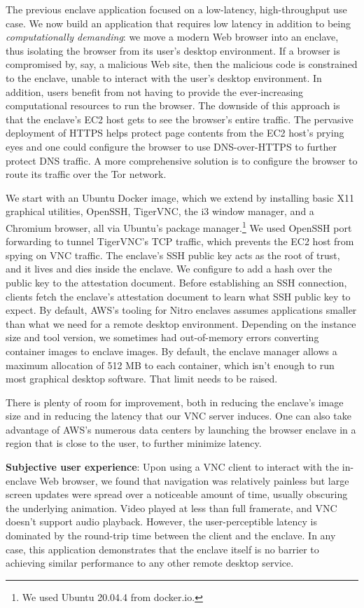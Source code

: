 The previous enclave application focused on a low-latency, high-throughput use
case.  We now build an application that requires low latency in addition to
being \emph{computationally demanding}: we move a modern Web browser into an
enclave, thus isolating the browser from its user's desktop environment.
If a browser is compromised by, say, a malicious Web site, then the malicious
code is constrained to the enclave, unable to interact with the user's desktop
environment.  In addition, users benefit from not having to provide the
ever-increasing computational resources to run the browser.
The downside of this approach is that the enclave's EC2 host gets to see the
browser's entire traffic.  The pervasive deployment of HTTPS helps protect page
contents from the EC2 host's prying eyes and one could configure the browser to
use DNS-over-HTTPS to further protect DNS traffic.  A more comprehensive
solution is to configure the browser to route its traffic over the Tor network.

We start with an Ubuntu Docker image, which we extend by
installing basic X11 graphical utilities, OpenSSH, TigerVNC, the i3 window
manager, and a Chromium browser, all via Ubuntu's package manager.\footnote{We
used Ubuntu 20.04.4 from docker.io.}  We used OpenSSH port forwarding to tunnel
TigerVNC's TCP traffic, which prevents the EC2 host from spying on VNC traffic.
The enclave's SSH public key acts as the root of trust, and it lives and dies
inside the enclave.  We configure \tool{} to add a hash over the public key to
the attestation document.  Before establishing an SSH connection, clients fetch
the enclave's attestation document to learn what SSH public key to expect.
%
By default, AWS's tooling for Nitro enclaves assumes applications smaller than
what we need for a remote desktop environment.  Depending on the instance size
and tool version, we sometimes had out-of-memory errors converting container
images to enclave images.  By default, the enclave manager allows a maximum
allocation of 512 MB to each container, which isn't enough to run most graphical
desktop software.  That limit needs to be raised.

There is plenty of room for improvement, both in reducing the enclave's image
size and in reducing the latency that our VNC server induces.  One can also take
advantage of AWS's numerous data centers by launching the browser enclave in a
region that is close to the user, to further minimize latency.

\textbf{Subjective user experience}:
Upon using a VNC client to interact with the in-enclave Web browser, we found
that navigation was relatively painless but large screen updates were spread
over a noticeable amount of time, usually obscuring the underlying animation.
Video played at less than full framerate, and VNC doesn't support audio
playback.  However, the user-perceptible latency is dominated by the round-trip
time between the client and the enclave.  In any case, this application
demonstrates that the enclave itself is no barrier to achieving similar
performance to any other remote desktop service.


